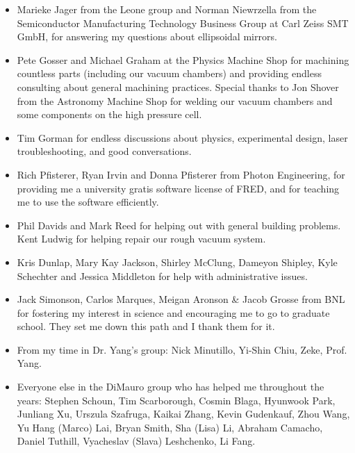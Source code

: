 \begin{acknowledgments}
\begin{itemize}
	\item Marieke Jager from the Leone group and Norman Niewrzella from the Semiconductor Manufacturing Technology Business Group at Carl Zeiss SMT GmbH, for answering my questions about ellipsoidal mirrors.
	\item Pete Gosser and Michael Graham at the Physics Machine Shop for machining countless parts (including our vacuum chambers) and providing endless consulting about general machining practices. Special thanks to Jon Shover from the Astronomy Machine Shop for welding our vacuum chambers and some components on the high pressure cell.
	\item Tim Gorman for endless discussions about physics, experimental design, laser troubleshooting, and good conversations.
	\item Rich Pfisterer, Ryan Irvin and Donna Pfisterer from Photon Engineering, for providing me a university gratis software license of FRED, and for teaching me to use the software efficiently.
	\item Phil Davids and Mark Reed for helping out with general building problems. Kent Ludwig for helping repair our rough vacuum system.
	\item Kris Dunlap, Mary Kay Jackson, Shirley McClung, Dameyon Shipley, Kyle Schechter and Jessica Middleton for help with administrative issues.
	\item Jack Simonson, Carlos Marques, Meigan Aronson \& Jacob Grosse from BNL for fostering my interest in science and encouraging me to go to graduate school. They set me down this path and I thank them for it.
	\item From my time in Dr. Yang's group: Nick Minutillo, Yi-Shin Chiu, Zeke, Prof. Yang.
	\item Everyone else in the DiMauro group who has helped me throughout the years: Stephen Schoun, Tim Scarborough, Cosmin Blaga, Hyunwook Park, Junliang Xu, Urszula Szafruga, Kaikai Zhang, Kevin Gudenkauf, Zhou Wang, Yu Hang (Marco) Lai, Bryan Smith, Sha (Lisa) Li, Abraham Camacho, Daniel Tuthill, Vyacheslav (Slava) Leshchenko, Li Fang.
\end{itemize}


\end{acknowledgments}